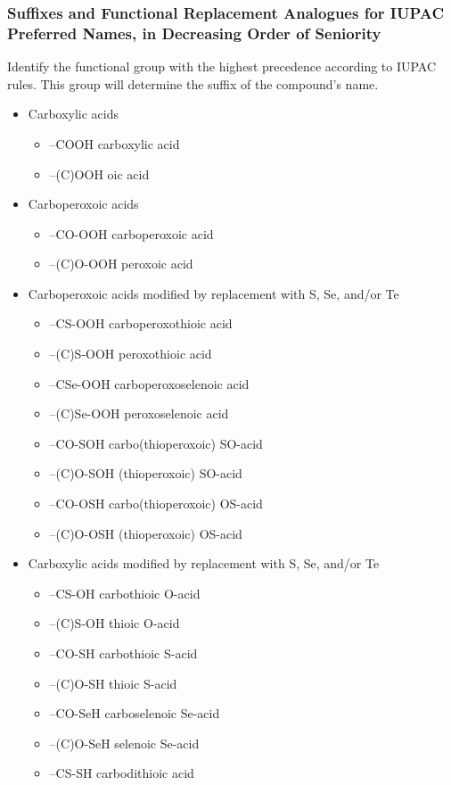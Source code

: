 \documentclass[a4paper,12pt]{report}
\begin{document}
\subsubsection{Suffixes and Functional Replacement Analogues for IUPAC Preferred Names, in Decreasing Order of Seniority}
Identify the functional group with the highest precedence according to IUPAC rules. This group will determine the suffix of the compound’s name.
\begin{itemize}
\item Carboxylic acids
\begin{itemize}
\item –COOH carboxylic acid
\item –(C)OOH oic acid
\end{itemize}
\item Carboperoxoic acids
\begin{itemize}
\item –CO-OOH carboperoxoic acid 
\item –(C)O-OOH peroxoic acid 
\end{itemize}
\item Carboperoxoic acids modified by replacement with S, Se, and/or Te 
\begin{itemize}
\item –CS-OOH carboperoxothioic acid 
\item –(C)S-OOH peroxothioic acid 
\item –CSe-OOH carboperoxoselenoic acid 
\item –(C)Se-OOH peroxoselenoic acid 
\item –CO-SOH carbo(thioperoxoic) SO-acid 
\item –(C)O-SOH (thioperoxoic) SO-acid 
\item –CO-OSH carbo(thioperoxoic) OS-acid 
\item –(C)O-OSH (thioperoxoic) OS-acid
\end{itemize}
\item Carboxylic acids modified by replacement with S, Se, and/or Te 
\begin{itemize}
\item –CS-OH carbothioic O-acid 
\item –(C)S-OH thioic O-acid 
\item –CO-SH carbothioic S-acid 
\item –(C)O-SH thioic S-acid 
\item –CO-SeH carboselenoic Se-acid 
\item –(C)O-SeH selenoic Se-acid 
\item –CS-SH carbodithioic acid 

\end{itemize}
\end{itemize}
\end{document}
